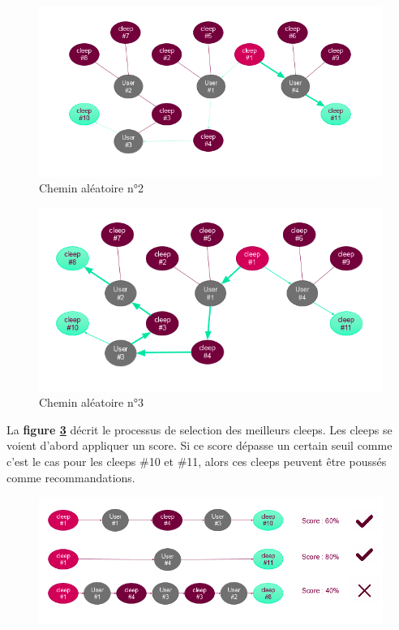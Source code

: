 \documentclass{article} %
\begin{document}
\begin{figure}[!h]
	\centering
	\includegraphics[keepaspectratio = true,scale=0.6]{ex3}
	\caption{Chemin aléatoire n°2}
	\label{fig:ex3}
\end{figure}

\begin{figure}[!h]
	\centering
	\includegraphics[keepaspectratio = true,scale=0.6]{ex4}
	\caption{Chemin aléatoire n°3}
	\label{fig:ex4}
\end{figure}

La \textbf{figure \ref{fig:ex5}} décrit le processus de selection des meilleurs cleeps. Les cleeps se voient d'abord appliquer un score. Si ce score dépasse un certain seuil comme c'est le cas pour les cleeps \#10 et \#11, alors ces cleeps peuvent être poussés comme recommandations.

\begin{figure}[!h]
	\centering
	\includegraphics[keepaspectratio = true,scale=0.6]{ex5}
	\caption{}
	\label{fig:ex5}
\end{figure}
\end{document}
